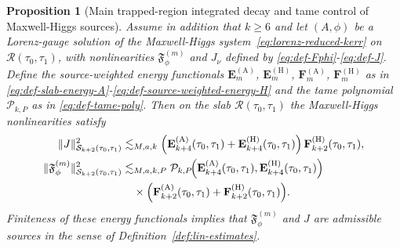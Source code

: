 \documentclass[11pt]{article}
\numberwithin{equation}{section}
\theoremstyle{plain}
\newtheorem{proposition}[theorem]{Proposition}
\theoremstyle{definition}
\theoremstyle{remark}
\begin{document}
\begin{proposition}[Main trapped-region integrated decay and tame control of Maxwell-Higgs sources]
\smallskip
Assume in addition that $k\ge6$ and let $(A,\phi)$ be a Lorenz-gauge solution of the Maxwell-Higgs system~\eqref{eq:lorenz-reduced-kerr} on $\mathcal R(\tau_{0},\tau_{1})$,
with nonlinearities $\mathfrak{F}_{\phi}^{(m)}$ and $J_{\nu}$ defined by \eqref{eq:def-Fphi}-\eqref{eq:def-J}.
Define the source-weighted energy functionals $\mathbf E_{m}^{(\mathrm A)}$, $\mathbf E_{m}^{(\mathrm H)}$, $\mathbf F_{m}^{(\mathrm A)}$, $\mathbf F_{m}^{(\mathrm H)}$ as in
\eqref{eq:def-slab-energy-A}-\eqref{eq:def-source-weighted-energy-H}
and the tame polynomial $\mathcal P_{k,P}$ as in \eqref{eq:def-tame-poly}.
Then on the slab $\mathcal R(\tau_{0},\tau_{1})$ the Maxwell-Higgs nonlinearities satisfy
\begin{eqnarray}
\|J\|_{\mathcal S_{k+2}(\tau_{0},\tau_{1})}^{2}
&\lesssim_{M,a,k}
\Bigl(\mathbf E_{k+4}^{(\mathrm A)}(\tau_{0},\tau_{1})
 +\mathbf E_{k+4}^{(\mathrm H)}(\tau_{0},\tau_{1})\Bigr)\,
\mathbf F_{k+2}^{(\mathrm H)}(\tau_{0},\tau_{1}),
\label{eq:kerr-J-source-bound-trap}\\
\|\mathfrak{F}_{\phi}^{(m)}\|_{\mathcal S_{k+2}(\tau_{0},\tau_{1})}^{2}
&\lesssim_{M,a,k,P}
\mathcal P_{k,P}\!\Bigl(
\mathbf E_{k+4}^{(\mathrm A)}(\tau_{0},\tau_{1}),
\mathbf E_{k+4}^{(\mathrm H)}(\tau_{0},\tau_{1})
\Bigr)\nonumber\\
&\quad\times
\Bigl(\mathbf F_{k+2}^{(\mathrm A)}(\tau_{0},\tau_{1})
+\mathbf F_{k+2}^{(\mathrm H)}(\tau_{0},\tau_{1})\Bigr).
\label{eq:kerr-higgs-source-bound-trap}
\end{eqnarray}
Finiteness of these energy functionals implies that $\mathfrak{F}_{\phi}^{(m)}$ and $J$ are admissible sources in the sense of Definition~\ref{def:lin-estimates}.
\end{proposition}
\end{document}

